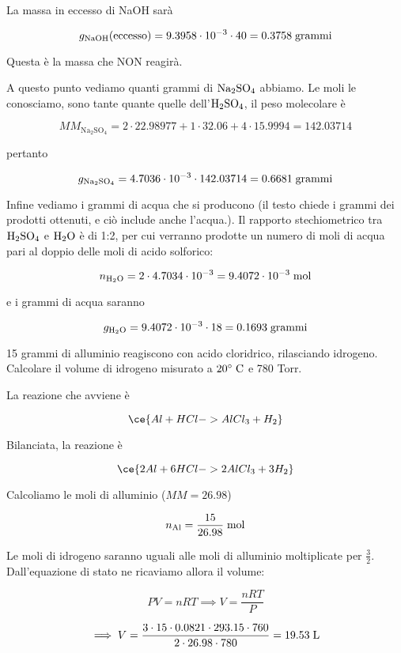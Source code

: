 \begin{soluzione}
La massa in eccesso di NaOH sarà

$$g_{\text{NaOH}}\text{(eccesso)}=9.3958 \cdot 10^{-3} \cdot 40=0.3758 \; \rm grammi$$

Questa è la massa che NON reagirà.

A questo punto vediamo quanti grammi di $\rm Na_2SO_4$ abbiamo. Le moli le conosciamo, sono tante quante quelle dell'$\rm H_2SO_4$, il peso molecolare è

$$MM_{\text{Na}_2\text{SO}_4}
=2\cdot22.98977 + 1 \cdot 32.06 + 4 \cdot 15.9994
=142.03714$$

pertanto

$$g_{\text{Na}_2\text{SO}_4}
=4.7036 \cdot 10^{-3} \cdot 142.03714
=0.6681 \; \rm grammi$$

Infine vediamo i grammi di acqua che si producono (il testo chiede i grammi dei prodotti ottenuti, e ciò include anche l'acqua.). Il rapporto stechiometrico tra $\rm H_2SO_4$ e $\rm H_2O$ è di 1:2, per cui verranno prodotte un numero di moli di acqua pari al doppio delle moli di acido solforico:

$$n_{\rm H_2O}= 2 \cdot 4.7034 \cdot 10^{-3}
=9.4072 \cdot 10^{-3} \; \rm mol$$

e i grammi di acqua saranno

$$g_{\rm H_2O}=9.4072 \cdot 10^{-3} \cdot 18=0.1693 \; \rm grammi$$
\end{soluzione}

\newpage

\begin{esercizio}
    15 grammi di alluminio reagiscono con acido cloridrico, rilasciando idrogeno. Calcolare il volume di idrogeno misurato a $20^{\circ} \; \rm C$ e 780 Torr.
\end{esercizio}
\begin{soluzione}
    La reazione che avviene è

$$\ce{Al + HCl -> AlCl_3 + H_2}$$

Bilanciata, la reazione è

$$\ce{2Al + 6HCl -> 2AlCl_3 + 3H_2}$$

Calcoliamo le moli di alluminio ($MM=26.98$)

$$n_{\text{Al}}=\frac{15}{26.98} \; \rm mol$$

Le moli di idrogeno saranno uguali alle moli di alluminio moltiplicate per $\frac{3}{2}$. Dall'equazione di stato ne ricaviamo allora il volume:

$$PV=nRT \implies V=\frac{nRT}{P}$$

$$\implies V=\frac{3 \cdot 15 \cdot 0.0821 \cdot 293.15 \cdot 760}{2 \cdot 26.98 \cdot 780}=19.53 \; \rm L$$

\end{soluzione}

